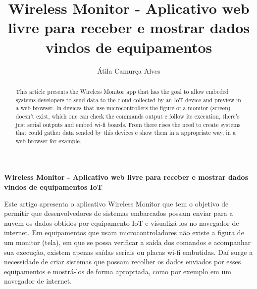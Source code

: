 \documentclass[a4paper,12pt]{article}
\title{Wireless Monitor - Aplicativo web livre para receber e mostrar dados vindos de equipamentos \iot}
\author{Átila Camurça Alves\inst{1}}
\newcommand{\wm}{Wireless Monitor\xspace}
\newcommand{\iot}{IoT\xspace}
\begin{document}
\begin{center}
\textbf{\large{Wireless Monitor - Aplicativo web livre para receber e mostrar dados vindos de equipamentos \iot}}
\end{center}

\begin{abstract}
This article presents the \wm app that has the goal to allow
embeded systems developers to send data to the cloud collected by
an \iot device and preview in a web browser.
In devices that use microcontrollers the figure of a monitor (screen)
doesn't exist, which one can check the commands output e follow
its execution, there's just serial outputs and embed wi-fi boards.
From there rises the need to create systems that could gather data
sended by this devices e show them in a appropriate way, in a web browser
for example.
\end{abstract}
     
\begin{resumo}
Este artigo apresenta o aplicativo \wm que tem o objetivo de permitir que
desenvolvedores de sistemas embarcados possam enviar para a nuvem
os dados obtidos por equipamento \iot e visualizá-los no navegador de internet.
Em equipamentos que usam microcontroladores não existe a figura de
um monitor (tela), em que se possa verificar a saída dos comandos e acompanhar
sua execução, existem apenas saídas seriais ou placas wi-fi embutidas.
Daí surge a necessidade de criar sistemas que possam recolher os dados
enviados por esses equipamentos e mostrá-los de forma apropriada, como por exemplo
em um navegador de internet.
\end{resumo}





\end{document}
